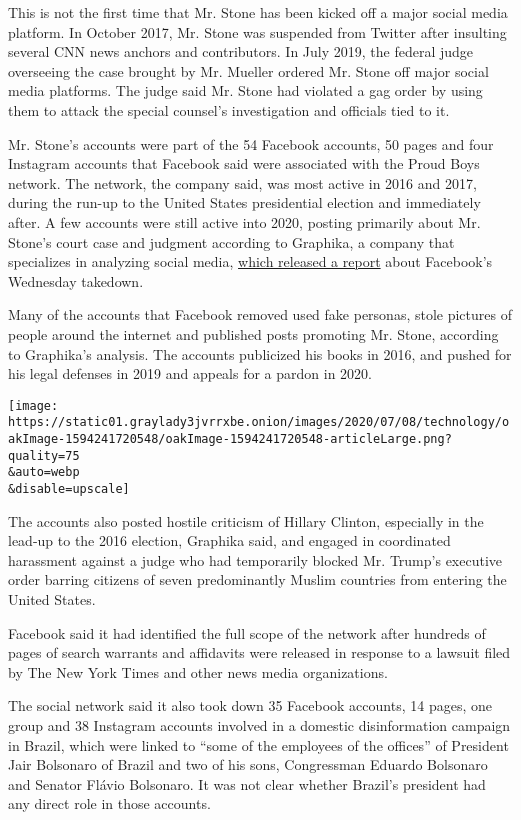 This is not the first time that Mr. Stone has been kicked off a major
social media platform. In October 2017, Mr. Stone was suspended from
Twitter after insulting several CNN news anchors and contributors. In
July 2019, the federal judge overseeing the case brought by Mr. Mueller
ordered Mr. Stone off major social media platforms. The judge said Mr.
Stone had violated a gag order by using them to attack the special
counsel's investigation and officials tied to it.

Mr. Stone's accounts were part of the 54 Facebook accounts, 50 pages and
four Instagram accounts that Facebook said were associated with the
Proud Boys network. The network, the company said, was most active in
2016 and 2017, during the run-up to the United States presidential
election and immediately after. A few accounts were still active into
2020, posting primarily about Mr. Stone's court case and judgment
according to Graphika, a company that specializes in analyzing social
media,
\href{https://public-assets.graphika.com/reports/graphika_report_roger_stone_takedown.pdf}{which
released a report} about Facebook's Wednesday takedown.

Many of the accounts that Facebook removed used fake personas, stole
pictures of people around the internet and published posts promoting Mr.
Stone, according to Graphika's analysis. The accounts publicized his
books in 2016, and pushed for his legal defenses in 2019 and appeals for
a pardon in 2020.

\texttt{[image: https://static01.graylady3jvrrxbe.onion/images/2020/07/08/technology/oakImage-1594241720548/oakImage-1594241720548-articleLarge.png?quality=75\\\&auto=webp\\\&disable=upscale]}

The accounts also posted hostile criticism of Hillary Clinton,
especially in the lead-up to the 2016 election, Graphika said, and
engaged in coordinated harassment against a judge who had temporarily
blocked Mr. Trump's executive order barring citizens of seven
predominantly Muslim countries from entering the United States.

Facebook said it had identified the full scope of the network after
hundreds of pages of search warrants and affidavits were released in
response to a lawsuit filed by The New York Times and other news media
organizations.

The social network said it also took down 35 Facebook accounts, 14
pages, one group and 38 Instagram accounts involved in a domestic
disinformation campaign in Brazil, which were linked to ``some of the
employees of the offices'' of President Jair Bolsonaro of Brazil and two
of his sons, Congressman Eduardo Bolsonaro and Senator Flávio Bolsonaro.
It was not clear whether Brazil's president had any direct role in those
accounts.

